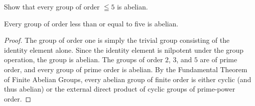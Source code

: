 \begin{exercise}
	Show that every group of order $\leqq 5$ is abelian.
\end{exercise}
\begin{proposition}
	Every group of order less than or equal to five is abelian.
\end{proposition}
\begin{proof}
	The group of order one is simply the trivial group consisting of the identity element alone. Since the identity element is nilpotent under the group operation, the group is abelian. The groups of order $2$, $3$, and $5$ are of prime order, and every group of prime order is abelian.
	\newline\newline
	By the Fundamental Theorem of Finite Abelian Groups, every abelian group of finite order is either cyclic (and thus abelian) or the external direct product of cyclic groups of prime-power order.
\end{proof}

